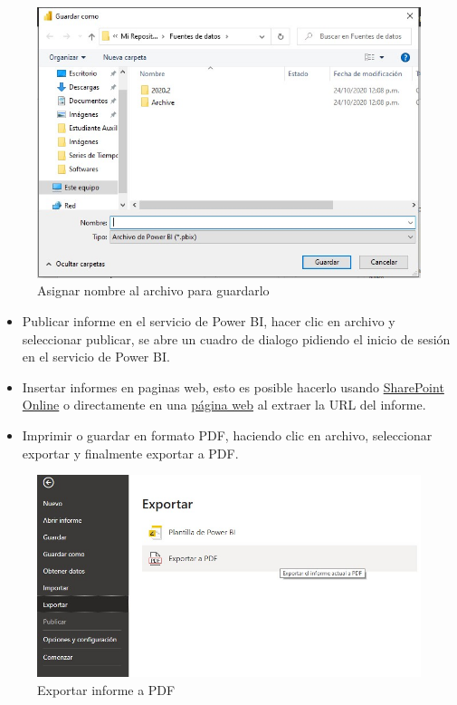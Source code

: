 \documentclass[
]{book}
\begin{document}
\begin{figure}

{\centering \includegraphics[width=0.6\linewidth]{Imágenes/powerbi2} 

}

\caption{Asignar nombre al archivo para guardarlo}\label{fig:guardararchivo2-fig}
\end{figure}

\begin{itemize}
\item
  Publicar informe en el servicio de Power BI, hacer clic en archivo y seleccionar publicar, se abre un cuadro de dialogo pidiendo el inicio de sesión en el servicio de Power BI.
\item
  Insertar informes en paginas web, esto es posible hacerlo usando \href{https://docs.microsoft.com/es-es/power-bi/collaborate-share/service-embed-report-spo}{SharePoint Online} o directamente en una \href{https://docs.microsoft.com/es-es/power-bi/collaborate-share/service-embed-secure}{página web} al extraer la URL del informe.
\item
  Imprimir o guardar en formato PDF, haciendo clic en archivo, seleccionar exportar y finalmente exportar a PDF.
\end{itemize}

\begin{figure}

{\centering \includegraphics[width=0.6\linewidth]{Imágenes/powerbi3} 

}

\caption{Exportar informe a PDF}\label{fig:exportarinforme-fig}
\end{figure}
\end{document}
